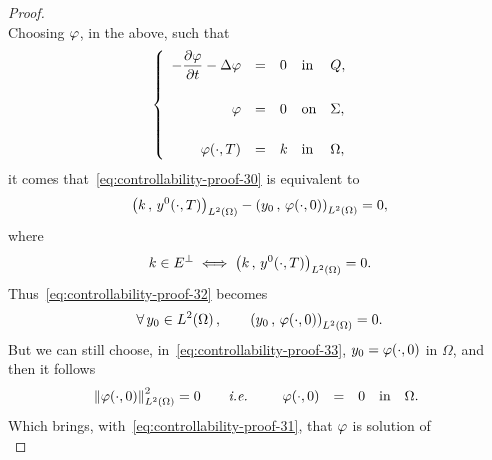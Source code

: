 \begin{proof}
\begin{equation}
    \end{equation}
    Choosing $\varphi$, in the above, such that
    \begin{equation}\label{eq:controllability-proof-31}
        \begin{cases}\displaystyle
            \begin{array}{rclll}
                -\dfrac{\partial{}\varphi}{\partial{}t} - \Delta\varphi & = & 0 & \text{in} & Q,\\
                \\
                \varphi & = & 0 & \text{on} & \Sigma,\\
                \\
                \varphi\!\left({\cdot,T}\right) & = & k & \text{in} &
                \Omega,
            \end{array}
        \end{cases}
    \end{equation}
    it comes that~\eqref{eq:controllability-proof-30} is equivalent to
    \begin{equation}\label{eq:controllability-proof-32}
        \scalaireohm{k}{y^{0}\!\left({\cdot,T}\right)} - \scalaireohm{%
            y_{0}
        }{%
            \vphi\!\left({\cdot,0}\right)
        } = 0,
    \end{equation}
    where
    \begin{equation*}
        k\in E^{\perp}\iff {\left({ k\,,\,y^{0}\!\left({\cdot,T}\right) }\right)}_{L^{2}\left({\Omega}\right)} =
        0.
    \end{equation*}
    Thus~\eqref{eq:controllability-proof-32} becomes
    \begin{equation}\label{eq:controllability-proof-33}
        \forall\,y_{0}\in\Ldeux{\Omega},\qquad \scalaireohm{y_{0}}{%
            \vphi\!\left({\cdot,0}\right)
        } = 0.
    \end{equation}
    But we can still choose, in~\eqref{eq:controllability-proof-33},
    $\displaystyle y_{0} = \varphi\!\left({\cdot,0}\right)$ in $\Omega$, and
    then it follows
    \begin{equation*}
        {\left\|{\varphi\!\left({\cdot,0}\right) }\right\|}_{L^{2}\left({\Omega}\right)}^{2} = 0\qquad\textit{i.e.}\qquad
        \begin{array}{rclll}
            \varphi\!\left({\cdot,0}\right) & = & 0 & \text{in} & \Omega.
        \end{array}
    \end{equation*}
    Which brings, with~\eqref{eq:controllability-proof-31}, that $\varphi$ is
    solution of
    \begin{equation*}

\end{equation*}
\end{proof}
